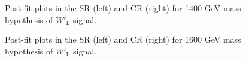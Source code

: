 \begin{figure}[H]
  \centering
  \caption{Post-fit plots in the SR (left) and CR (right) for 1400 GeV mass hypothesis of $W'_{\text{L}}$ signal.}
  \label{fig:Postfit_WpLH1400_Asimov}
\end{figure}
\begin{figure}[H]
  \centering
  \caption{Post-fit plots in the SR (left) and CR (right) for 1600 GeV mass hypothesis of $W'_{\text{L}}$ signal.}
  \label{fig:Postfit_WpLH1600_Asimov}
\end{figure}
